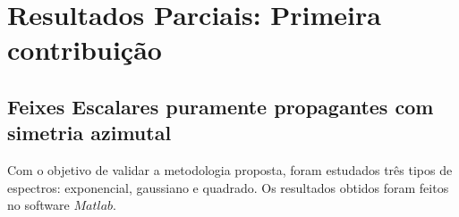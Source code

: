 \chapter{Resultados Parciais: Primeira contribui\c{c}\~ao}

\section{Feixes Escalares puramente propagantes com simetria azimutal}

Com o objetivo de validar a metodologia proposta, foram estudados 
tr\^es tipos de espectros: exponencial, gaussiano e quadrado. 
Os resultados obtidos foram feitos no software $Matlab$.
 
 
